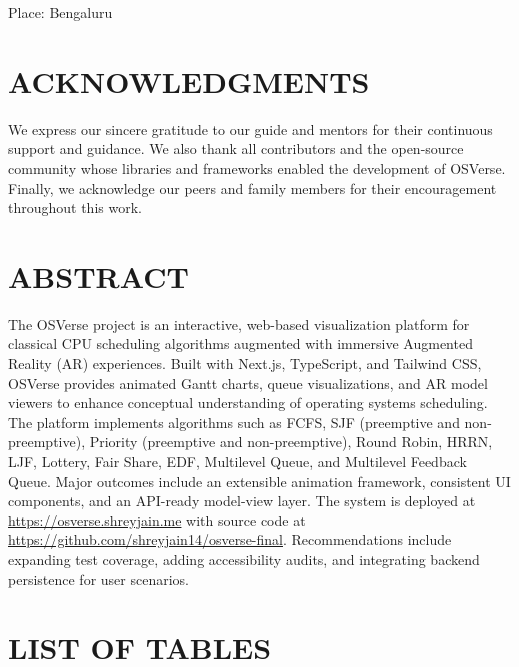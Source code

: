 \documentclass[12pt,a4paper,oneside]{report}
\newcommand{\projectShort}{OSVerse}
\newcommand{\githubURL}{https://github.com/shreyjain14/osverse-final}
\newcommand{\projectURL}{https://osverse.shreyjain.me}
\begin{document}
\vfill
\noindent Place: Bengaluru

\clearpage
{}
\setcounter{page}{3} %
\chapter*{\MakeUppercase{Acknowledgments}}
We express our sincere gratitude to our guide and mentors for their continuous support and guidance. We also thank all contributors and the open-source community whose libraries and frameworks enabled the development of \projectShort{}. Finally, we acknowledge our peers and family members for their encouragement throughout this work.

\clearpage
\chapter*{\MakeUppercase{Abstract}}
The OSVerse project is an interactive, web-based visualization platform for classical CPU scheduling algorithms augmented with immersive Augmented Reality (AR) experiences. Built with Next.js, TypeScript, and Tailwind CSS, OSVerse provides animated Gantt charts, queue visualizations, and AR model viewers to enhance conceptual understanding of operating systems scheduling. The platform implements algorithms such as FCFS, SJF (preemptive and non-preemptive), Priority (preemptive and non-preemptive), Round Robin, HRRN, LJF, Lottery, Fair Share, EDF, Multilevel Queue, and Multilevel Feedback Queue. Major outcomes include an extensible animation framework, consistent UI components, and an API-ready model-view layer. The system is deployed at \href{\projectURL}{\projectURL} with source code at \href{\githubURL}{\githubURL}. Recommendations include expanding test coverage, adding accessibility audits, and integrating backend persistence for user scenarios.

\clearpage
\thispagestyle{nohf}
{\hypersetup{linkcolor=black}\tableofcontents}
\clearpage

\chapter*{\MakeUppercase{List of Tables}}
\thispagestyle{fancy}
\listoftables
\end{document}
